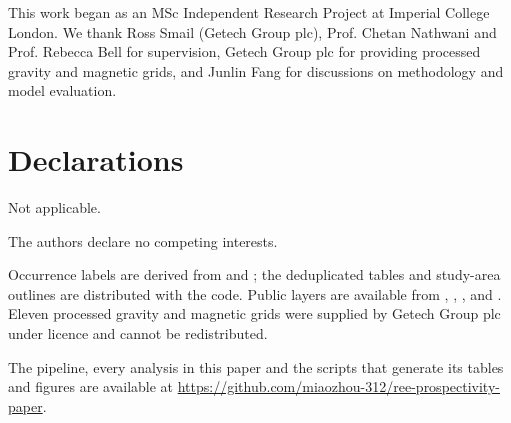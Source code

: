 \documentclass[pdflatex,sn-apa]{sn-jnl}
\begin{document}
\backmatter

This work began as an MSc Independent Research Project at Imperial College London. We thank Ross Smail (Getech Group plc), Prof. Chetan Nathwani and Prof. Rebecca Bell for supervision, Getech Group plc for providing processed gravity and magnetic grids, and Junlin Fang for discussions on methodology and model evaluation.

\section*{Declarations}

Not applicable.

The authors declare no competing interests.

Occurrence labels are derived from \citet{Orris2018} and \citet{Parsa2024}; the deduplicated tables and study-area outlines are distributed with the code. Public layers are available from \citet{McCafferty2023}, \citet{Jobin2017}, \citet{Miles2016}, \citet{BradleyDC2008} and \citet{Wheeler1996}. Eleven processed gravity and magnetic grids were supplied by Getech Group plc under licence and cannot be redistributed.

The pipeline, every analysis in this paper and the scripts that generate its tables and figures are available at \url{https://github.com/miaozhou-312/ree-prospectivity-paper}.
\end{document}
